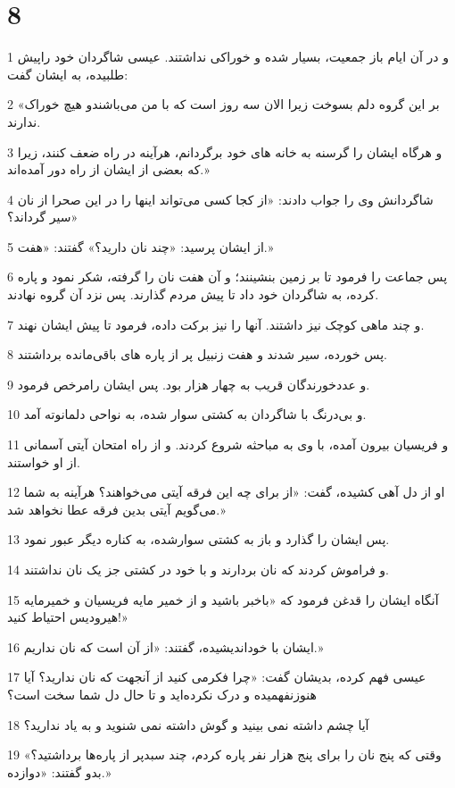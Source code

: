 \chapter{8}

\par 1 و در آن ایام باز جمعیت، بسیار شده و خوراکی نداشتند. عیسی شاگردان خود راپیش طلبیده، به ایشان گفت:
\par 2 «بر این گروه دلم بسوخت زیرا الان سه روز است که با من می‌باشندو هیچ خوراک ندارند.
\par 3 و هرگاه ایشان را گرسنه به خانه های خود برگردانم، هرآینه در راه ضعف کنند، زیرا که بعضی از ایشان از راه دور آمده‌اند.»
\par 4 شاگردانش وی را جواب دادند: «از کجا کسی می‌تواند اینها را در این صحرا از نان سیر گرداند؟»
\par 5 از ایشان پرسید: «چند نان دارید؟» گفتند: «هفت.»
\par 6 پس جماعت را فرمود تا بر زمین بنشینند؛ و آن هفت نان را گرفته، شکر نمود و پاره کرده، به شاگردان خود داد تا پیش مردم گذارند. پس نزد آن گروه نهادند.
\par 7 و چند ماهی کوچک نیز داشتند. آنها را نیز برکت داده، فرمود تا پیش ایشان نهند.
\par 8 پس خورده، سیر شدند و هفت زنبیل پر از پاره های باقی‌مانده برداشتند.
\par 9 و عددخورندگان قریب به چهار هزار بود. پس ایشان رامرخص فرمود.
\par 10 و بی‌درنگ با شاگردان به کشتی سوار شده، به نواحی دلمانوته آمد.
\par 11 و فریسیان بیرون آمده، با وی به مباحثه شروع کردند. و از راه امتحان آیتی آسمانی از او خواستند.
\par 12 او از دل آهی کشیده، گفت: «از برای چه این فرقه آیتی می‌خواهند؟ هرآینه به شما می‌گویم آیتی بدین فرقه عطا نخواهد شد.»
\par 13 پس ایشان را گذارد و باز به کشتی سوارشده، به کناره دیگر عبور نمود.
\par 14 و فراموش کردند که نان بردارند و با خود در کشتی جز یک نان نداشتند.
\par 15 آنگاه ایشان را قدغن فرمود که «باخبر باشید و از خمیر مایه فریسیان و خمیرمایه هیرودیس احتیاط کنید!»
\par 16 ایشان با خوداندیشیده، گفتند: «از آن است که نان نداریم.»
\par 17 عیسی فهم کرده، بدیشان گفت: «چرا فکرمی کنید از آنجهت که نان ندارید؟ آیا هنوزنفهمیده و درک نکرده‌اید و تا حال دل شما سخت است؟
\par 18 آیا چشم داشته نمی بینید و گوش داشته نمی شنوید و به یاد ندارید؟
\par 19 وقتی که پنج نان را برای پنج هزار نفر پاره کردم، چند سبدپر از پاره‌ها برداشتید؟» بدو گفتند: «دوازده.»
